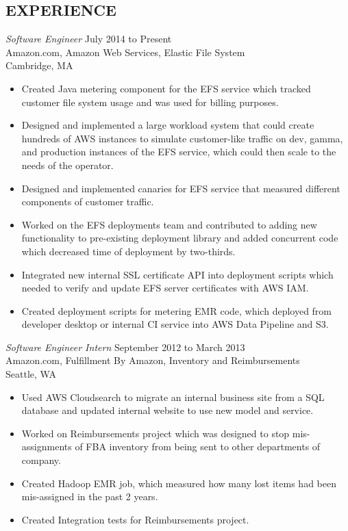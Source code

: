 \documentclass[margin]{res}
\begin{document}
\begin{resume}
\section{EXPERIENCE} {\sl Software Engineer} \hfill July 2014 to Present \\
                Amazon.com, Amazon Web Services, Elastic File System \\
                Cambridge, MA 
                 \begin{itemize}  \itemsep -0pt %
                \item Created Java metering component for the EFS service which tracked customer file system usage and was used for billing purposes.
                \item Designed and implemented a large workload system that could create hundreds of AWS instances to simulate customer-like traffic on dev, gamma, and production instances of the EFS service, which could then scale to the needs of the operator.
                \item Designed and implemented canaries for EFS service that measured different components of customer traffic.
                \item Worked on the EFS deployments team and contributed to adding new functionality to pre-existing deployment library and added concurrent code which decreased time of deployment by two-thirds.
                \item Integrated new internal SSL certificate API into deployment scripts which needed to verify and update EFS server certificates with AWS IAM.
                \item Created deployment scripts for metering EMR code, which deployed from developer desktop or internal CI service into AWS Data Pipeline and S3.
                \end{itemize}
                {\sl Software Engineer Intern} \hfill September 2012 to March 2013 \\
                Amazon.com, Fulfillment By Amazon, Inventory and Reimbursements \\
                Seattle, WA 
                \begin{itemize} \itemsep -0pt
                \item Used AWS Cloudsearch to migrate an internal business site from a SQL database and updated internal website to use new model and service. 
                \item Worked on Reimbursements project which was designed to stop mis-assignments of FBA inventory from being sent to other departments of company.
                \item Created Hadoop EMR job, which measured how many lost items had been mis-assigned in the past 2 years.
                \item Created Integration tests for Reimbursements project.
                \end{itemize}
   

\end{resume}
\end{document}
